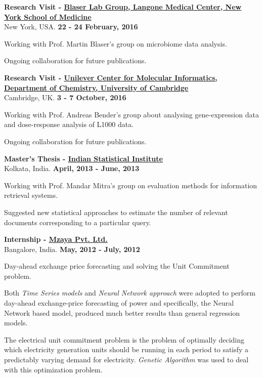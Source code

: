 \documentclass[10pt]{article}
\newenvironment{innerlist}[1][\enskip\textbullet]%
        {\begin{compactitem}[#1]}{\end{compactitem}}
\newcommand{\blankline}{\quad\pagebreak[2]}
\begin{document}
\blankline

\textbf{Research Visit - \href{https://med.nyu.edu/medicine/labs/blaserlab/}{Blaser Lab Group, Langone Medical Center, New York School of Medicine}} \\
New York, USA.
\hfill \textbf{22 - 24 February, 2016}
\begin{innerlist}
\item Working with Prof. Martin Blaser's group on microbiome data analysis. 
\item Ongoing collaboration for future publications.
\end{innerlist}

\blankline

\textbf{Research Visit - \href{https://www.ch.cam.ac.uk/person/ab454}{Unilever Center for Molecular Informatics, Department of Chemistry, University of Cambridge}} \\
Cambridge, UK.
\hfill \textbf{3 - 7 October, 2016}
\begin{innerlist}
\item Working with Prof. Andreas Bender's group about analysing gene-expression data and dose-response analysis of L1000 data. 
\item Ongoing collaboration for future publications.
\end{innerlist}

\blankline

\textbf{Master's Thesis - \href{http://www.isical.ac.in/}{Indian Statistical Institute}} \\
Kolkata, India.
\hfill \textbf{April, 2013 - June, 2013}
\begin{innerlist}
\item Working with Prof. Mandar Mitra's group on evaluation methods for information retrieval systems. 
\item Suggested new statistical approaches to estimate the number of relevant documents corresponding to a particular query.
\end{innerlist}
\newpage

\blankline 

\textbf{Internship - \href{http://www.mzaya.in/}{Mzaya Pvt. Ltd.}} \\
Bangalore, India.
\hfill \textbf{May, 2012 - July, 2012}
\begin{innerlist}
\item Day-ahead exchange price forecasting and solving the Unit Commitment problem.
\item Both \emph{Time Series models} and \emph{Neural Network approach} were adopted to perform day-ahead exchange-price forecasting of power and specifically, the Neural Network based model, produced much better results than general regression models.
\item The electrical unit commitment problem is the problem of optimally deciding which electricity generation units should be running in each period to satisfy a predictably varying demand for electricity. \emph{Genetic Algorithm} was used to deal with this optimization problem.
\end{innerlist}
\end{document}
